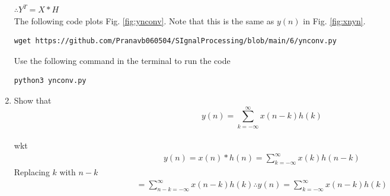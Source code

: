 \documentclass[journal,12pt,twocolumn]{IEEEtran}
\renewcommand\thesection{\arabic{section}}
\begin{document}
\begin{enumerate}[label=\thesection.\arabic*]
$\therefore Y^{T}= X*H$\\
 The following code plots Fig. \ref{fig:ynconv}. Note that this is the same as 
$y(n)$ in  Fig. 
\ref{fig:xnyn}. 
%
\begin{lstlisting}
wget https://github.com/Pranavb060504/SIgnalProcessing/blob/main/6/ynconv.py
\end{lstlisting}
Use the following command in the terminal to run the code
\begin{lstlisting}
python3 ynconv.py
\end{lstlisting}

\item Show that
\begin{equation}
y(n) =  \sum_{k=-\infty}^{\infty}x(n-k)h(k)
\end{equation}\\
\solution
wkt
\begin{align}
y(n) = x(n)*h(n) = \sum_{k=-\infty}^{\infty}x(k)h(n-k)
\end{align} 
Replacing $k$ with $n-k$
\begin{align}
=\sum_{n-k=-\infty}^{\infty}x(n-k)h(k)
\therefore y(n)=\sum_{k=-\infty}^{\infty}x(n-k)h(k)
\end{align}
\end{enumerate}
%
\end{document}
